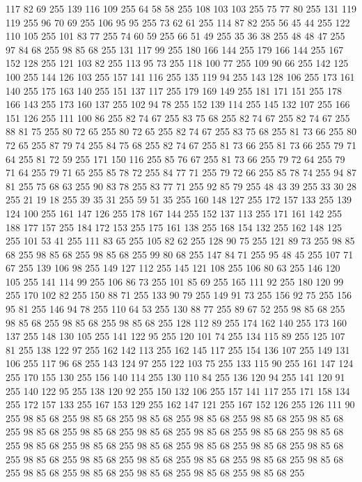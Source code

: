 117 82 69 255 139 116 109 255 64 58 58 255 108 103 103 255 75 77 80 255 131 119 119 255 96 70 69 255 106 95 95 255 73 62 61 255 114 87 82 255 56 45 44 255 122 110 105 255 101 83 77 255 74 60 59 255 66 51 49 255 35 36 38 255 48 48 47 255 97 84 68 255 98 85 68 255 131 117 99 255 180 166 144 255 179 166 144 255 167 152 128 255 121 103 82 255 113 95 73 255 118 100 77 255 109 90 66 255 142 125 100 255 144 126 103 255 157 141 116 255 135 119 94 255 143 128 106 255 173 161 140 255 175 163 140 255 151 137 117 255 179 169 149 255 181 171 151 255 178 166 143 255 173 160 137 255 102 94 78 255 152 139 114 255 145 132 107 255 166 151 126 255 111 100 86 255 82 74 67 255 83 75 68 255 82 74 67 255 82 74 67 255 88 81 75 255 80 72 65 255 80 72 65 255 82 74 67 255 83 75 68 255 81 73 66 255 80 72 65 255 87 79 74 255 84 75 68 255 82 74 67 255 81 73 66 255 81 73 66 255 79 71 64 255 81 72 59 255 171 150 116 255 85 76 67 255
81 73 66 255 79 72 64 255 79 71 64 255 79 71 65 255 85 78 72 255 84 77 71 255 79 72 66 255 85 78 74 255 94 87 81 255 75 68 63 255 90 83 78 255 83 77 71 255 92 85 79 255 48 43 39 255 33 30 28 255 21 19 18 255 39 35 31 255 59 51 35 255 160 148 127 255 172 157 133 255 139 124 100 255 161 147 126 255 178 167 144 255 152 137 113 255 171 161 142 255 188 177 157 255 184 172 153 255 175 161 138 255 168 154 132 255 162 148 125 255 101 53 41 255 111 83 65 255 105 82 62 255 128 90 75 255 121 89 73 255 98 85 68 255 98 85 68 255 98 85 68 255 99 80 68 255 147 84 71 255 95 48 45 255 107 71 67 255 139 106 98 255 149 127 112 255 145 121 108 255 106 80 63 255 146 120 105 255 141 114 99 255 106 86 73 255 101 85 69 255 165 111 92 255 180 120 99 255 170 102 82 255 150 88 71 255 133 90 79 255 149 91 73 255 156 92 75 255 156 95 81 255 146 94 78 255 110 64 53 255 130 88 77 255 89 67 52 255 98 85 68 255 98 85 68 255
98 85 68 255 98 85 68 255 128 112 89 255 174 162 140 255 173 160 137 255 148 130 105 255 141 122 95 255 120 101 74 255 134 115 89 255 125 107 81 255 138 122 97 255 162 142 113 255 162 145 117 255 154 136 107 255 149 131 106 255 117 96 68 255 143 124 97 255 122 103 75 255 133 115 90 255 161 147 124 255 170 155 130 255 156 140 114 255 130 110 84 255 136 120 94 255 141 120 91 255 140 122 95 255 138 120 92 255 150 132 106 255 157 141 117 255 171 158 134 255 172 157 133 255 167 153 129 255 162 147 121 255 167 152 126 255 126 111 90 255 98 85 68 255 98 85 68 255 98 85 68 255 98 85 68 255 98 85 68 255 98 85 68 255 98 85 68 255 98 85 68 255 98 85 68 255 98 85 68 255 98 85 68 255 98 85 68 255 98 85 68 255 98 85 68 255 98 85 68 255 98 85 68 255 98 85 68 255 98 85 68 255 98 85 68 255 98 85 68 255 98 85 68 255 98 85 68 255 98 85 68 255 98 85 68 255 98 85 68 255 98 85 68 255 98 85 68 255 98 85 68 255 98 85 68 255
